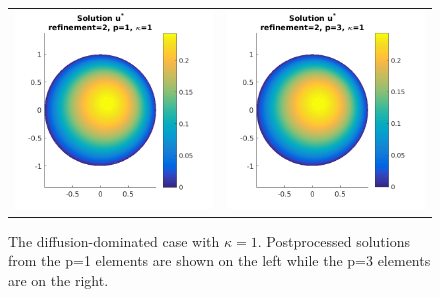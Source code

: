 \documentclass{article}
\begin{document}
\begin{figure}[!ht]
\begin{tabular}{c c}
\includegraphics[scale=0.7]{umustar_131.png} &
\includegraphics[scale=0.7]{umustar_231.png}
\end{tabular}
\caption{The diffusion-dominated case with $\kappa = 1$. Postprocessed solutions from the p=1 elements are shown on the left while the p=3 elements are on the right.}
\label{fig:ustar100}
\end{figure}
\end{document}
